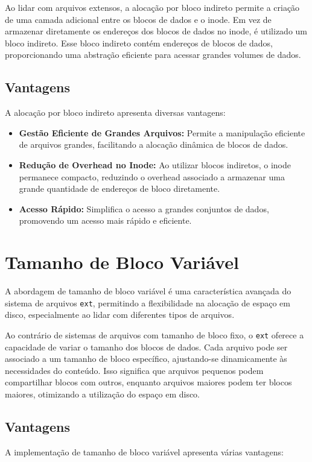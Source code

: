 \documentclass[
	12pt,				%
	openright,			%
	oneside,			%
	a4paper,			%
	chapter=TITLE,		%
	english,			%
	french,				%
	spanish,			%
	brazil				%
	]{abntex2}
\theoremstyle{definition}
\begin{document}
Ao lidar com arquivos extensos, a alocação por bloco indireto permite a criação de uma camada 
adicional entre os blocos de dados e o inode. Em vez de armazenar diretamente os endereços dos 
blocos de dados no inode, é utilizado um bloco indireto. Esse bloco indireto contém endereços 
de blocos de dados, proporcionando uma abstração eficiente para acessar grandes volumes de dados.

\subsection{Vantagens}
A alocação por bloco indireto apresenta diversas vantagens:

\begin{itemize}
    \item \textbf{Gestão Eficiente de Grandes Arquivos:} Permite a manipulação eficiente de arquivos grandes, facilitando a alocação dinâmica de blocos de dados.
    
    \item \textbf{Redução de Overhead no Inode:} Ao utilizar blocos indiretos, o inode permanece compacto, reduzindo o overhead associado a armazenar uma grande quantidade de endereços de bloco diretamente.
    
    \item \textbf{Acesso Rápido:} Simplifica o acesso a grandes conjuntos de dados, promovendo um acesso mais rápido e eficiente.
\end{itemize}

\section{Tamanho de Bloco Variável}
A abordagem de tamanho de bloco variável é uma característica avançada do sistema de arquivos \texttt{ext}, permitindo a flexibilidade na alocação de espaço em disco, especialmente ao lidar com diferentes tipos de arquivos.

Ao contrário de sistemas de arquivos com tamanho de bloco fixo, o \texttt{ext} oferece a capacidade de variar o tamanho dos blocos de dados. Cada arquivo pode ser associado a um tamanho de bloco específico, ajustando-se dinamicamente às necessidades do conteúdo. Isso significa que arquivos pequenos podem compartilhar blocos com outros, enquanto arquivos maiores podem ter blocos maiores, otimizando a utilização do espaço em disco.

\subsection{Vantagens}
A implementação de tamanho de bloco variável apresenta várias vantagens:
\end{document}
